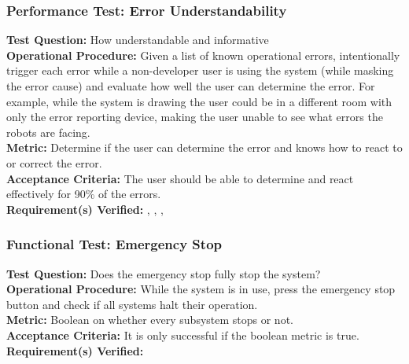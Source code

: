 \subsubsection{Performance Test: Error Understandability}
\label{test:ui_pt_error_understand}
\textbf{Test Question:} How understandable and informative \\
\textbf{Operational Procedure:} Given a list of known operational errors, intentionally trigger each error while a non-developer user is using the system (while masking the error cause) and evaluate how well the user can determine the error. For example, while the system is drawing the user could be in a different room with only the error reporting device, making the user unable to see what errors the robots are facing.\\
\textbf{Metric:}  Determine if the user can determine the error and knows how to react to or correct the error. \\
\textbf{Acceptance Criteria:}  The user should be able to determine and react effectively for 90\% of the errors.\\
\textbf{Requirement(s) Verified:} , , , 

\subsubsection{Functional Test: Emergency Stop}
\label{test:ui_ft_emergency_stop}
\textbf{Test Question:} Does the emergency stop fully stop the system? \\
\textbf{Operational Procedure:} While the system is in use, press the emergency stop button and check if all systems halt their operation. \\
\textbf{Metric:} Boolean on whether every subsystem stops or not. \\
\textbf{Acceptance Criteria:} It is only successful if the boolean metric is true. \\
\textbf{Requirement(s) Verified:} 

